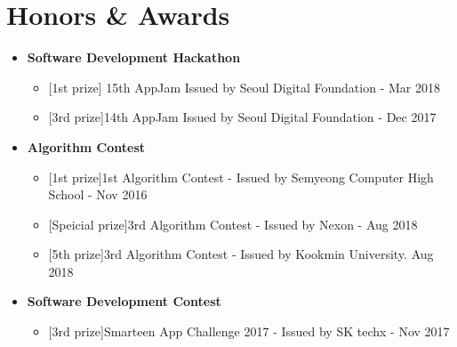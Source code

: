\documentclass[letterpaper,11pt]{article}
\newcommand{\resumeSubHeadingListStart}{\begin{itemize}[leftmargin=*]}
\newcommand{\resumeSubHeadingListEnd}{\end{itemize}}
\begin{document}
\section{Honors \& Awards}
 \resumeSubHeadingListStart
   \item{
     \textbf{Software Development Hackathon}
     \begin{itemize}
      \item{[1st prize] 15th AppJam Issued by Seoul Digital Foundation - Mar 2018}
      \item{[3rd prize]}{14th AppJam Issued by Seoul Digital Foundation - Dec 2017}
     \end{itemize}
     }
     \item{
       \textbf{Algorithm Contest}
       \begin{itemize}
        \item{[1st prize]}{1st Algorithm Contest - Issued by Semyeong Computer High School - Nov 2016}
        \item{[Speicial prize]}{3rd Algorithm Contest - Issued by Nexon - Aug 2018}
        \item{[5th prize]}{3rd Algorithm Contest - Issued by Kookmin University. Aug 2018}
      \end{itemize}
   }
     \item{
       \textbf{Software Development Contest}
       \begin{itemize}
        \item{[3rd prize]}{Smarteen App Challenge 2017 - Issued by SK techx - Nov 2017}
      \end{itemize}
   }
 \resumeSubHeadingListEnd



\end{document}
